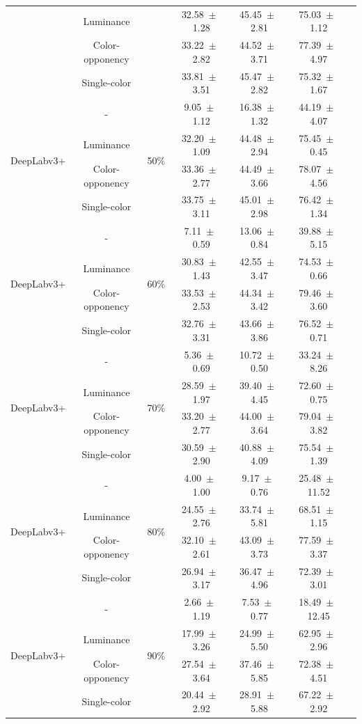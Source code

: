 \begin{table}[h]
\begin{tabular}{@{}lccc ccc@{}}
& Luminance & & 32.58~$\pm$~1.28 & 45.45~$\pm$~2.81 & 75.03~$\pm$~1.12 \\
& Color-opponency & & 33.22~$\pm$~2.82 & 44.52~$\pm$~3.71 & 77.39~$\pm$~4.97 \\
& Single-color & & 33.81~$\pm$~3.51 & 45.47~$\pm$~2.82 & 75.32~$\pm$~1.67 \\
\midrule
\multirow{4}{*}{DeepLabv3+} & - & \multirow{4}{*}{50\%} & 9.05~$\pm$~1.12 & 16.38~$\pm$~1.32 & 44.19~$\pm$~4.07 \\
& Luminance & & 32.20~$\pm$~1.09 & 44.48~$\pm$~2.94 & 75.45~$\pm$~0.45 \\
& Color-opponency & & 33.36~$\pm$~2.77 & 44.49~$\pm$~3.66 & 78.07~$\pm$~4.56 \\
& Single-color & & 33.75~$\pm$~3.11 & 45.01~$\pm$~2.98 & 76.42~$\pm$~1.34 \\
\midrule
\multirow{4}{*}{DeepLabv3+} & - & \multirow{4}{*}{60\%} & 7.11~$\pm$~0.59 & 13.06~$\pm$~0.84 & 39.88~$\pm$~5.15 \\
& Luminance & & 30.83~$\pm$~1.43 & 42.55~$\pm$~3.47 & 74.53~$\pm$~0.66 \\
& Color-opponency & & 33.53~$\pm$~2.53 & 44.34~$\pm$~3.42 & 79.46~$\pm$~3.60 \\
& Single-color & & 32.76~$\pm$~3.31 & 43.66~$\pm$~3.86 & 76.52~$\pm$~0.71 \\
\midrule
\multirow{4}{*}{DeepLabv3+} & - & \multirow{4}{*}{70\%} & 5.36~$\pm$~0.69 & 10.72~$\pm$~0.50 & 33.24~$\pm$~8.26 \\
& Luminance & & 28.59~$\pm$~1.97 & 39.40~$\pm$~4.45 & 72.60~$\pm$~0.75 \\
& Color-opponency & & 33.20~$\pm$~2.77 & 44.00~$\pm$~3.64 & 79.04~$\pm$~3.82 \\
& Single-color & & 30.59~$\pm$~2.90 & 40.88~$\pm$~4.09 & 75.54~$\pm$~1.39 \\
\midrule
\multirow{4}{*}{DeepLabv3+} & - & \multirow{4}{*}{80\%} & 4.00~$\pm$~1.00 & 9.17~$\pm$~0.76 & 25.48~$\pm$~11.52 \\
& Luminance & & 24.55~$\pm$~2.76 & 33.74~$\pm$~5.81 & 68.51~$\pm$~1.15 \\
& Color-opponency & & 32.10~$\pm$~2.61 & 43.09~$\pm$~3.73 & 77.59~$\pm$~3.37 \\
& Single-color & & 26.94~$\pm$~3.17 & 36.47~$\pm$~4.96 & 72.39~$\pm$~3.01 \\
\midrule
\multirow{4}{*}{DeepLabv3+} & - & \multirow{4}{*}{90\%} & 2.66~$\pm$~1.19 & 7.53~$\pm$~0.77 & 18.49~$\pm$~12.45 \\
& Luminance & & 17.99~$\pm$~3.26 & 24.99~$\pm$~5.50 & 62.95~$\pm$~2.96 \\
& Color-opponency & & 27.54~$\pm$~3.64 & 37.46~$\pm$~5.85 & 72.38~$\pm$~4.51 \\
& Single-color & & 20.44~$\pm$~2.92 & 28.91~$\pm$~5.88 & 67.22~$\pm$~2.92 \\
\midrule
\bottomrule
\end{tabular}
\label{tab:sparse_results_deeplabv3plus_acdc_snow}
\end{table}